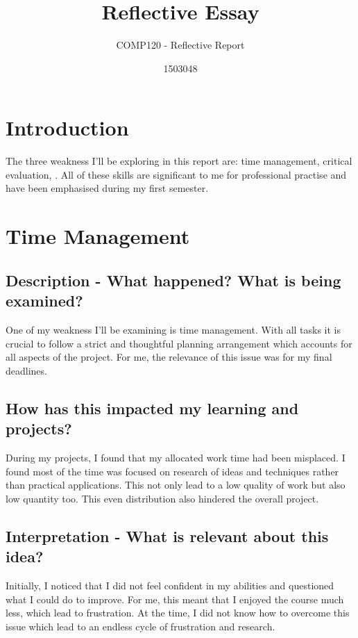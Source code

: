\documentclass{scrartcl}
\title{Reflective Essay}
\subtitle{COMP120 - Reflective Report}
\author{1503048}
\begin{document}
\maketitle


\section{Introduction}

The three weakness I'll be exploring in this report are: time management, critical evaluation, . All of these skills are significant to me for professional practise and have been emphasised during my first semester.

\section{Time Management}

\subsection{Description - What happened? What is being examined?}

One of my weakness I'll be examining is time management. With all tasks it is crucial to follow a strict and thoughtful planning arrangement which accounts for all aspects of the project. For me, the relevance of this issue was for my final deadlines.

\subsection{How has this impacted my learning and projects?}

During my projects, I found that my allocated work time had been misplaced. I found most of the time was focused on research of ideas and techniques rather than practical applications. This not only lead to a low quality of work but also low quantity too. This even distribution also hindered the overall project.


\subsection{Interpretation - What is relevant about this idea?}

Initially, I noticed that I did not feel confident in my abilities and questioned what I could do to improve. For me, this meant that I enjoyed the course much less, which lead to frustration. At the time, I did not know how to overcome this issue which lead to an endless cycle of frustration and research.
\end{document}

